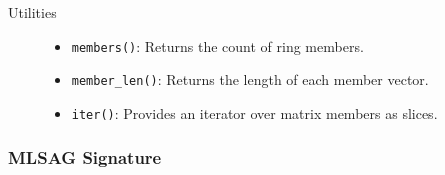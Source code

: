 \begin{description}
\item[Utilities] \hfill 
\begin{itemize}
\item \texttt{members()}: Returns the count of ring members. %
\item \texttt{member\_len()}: Returns the length of each member vector. %
\item \texttt{iter()}: Provides an iterator over matrix members as slices. %
\end{itemize}
\end{description}

\subsubsection{MLSAG Signature}

